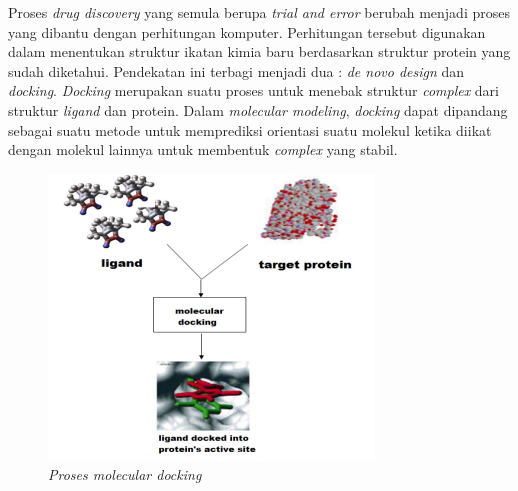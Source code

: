Proses \textit{drug discovery} yang semula berupa \textit{trial and error} berubah menjadi proses yang dibantu dengan perhitungan komputer. Perhitungan tersebut digunakan dalam menentukan struktur ikatan kimia baru berdasarkan struktur protein yang sudah diketahui. Pendekatan ini terbagi menjadi dua : \textit{de novo design} dan \textit{docking}. \textit{Docking} merupakan suatu proses untuk menebak struktur \textit{complex} dari struktur \textit{ligand} dan protein. Dalam \textit{molecular modeling}, \textit{docking} dapat dipandang sebagai suatu metode untuk memprediksi orientasi suatu molekul ketika diikat dengan molekul lainnya untuk membentuk \textit{complex} yang stabil.  
\begin{figure}
	\centering
	\includegraphics{docking.png}
	\caption{\textit{Proses molecular docking }}
\end{figure}

